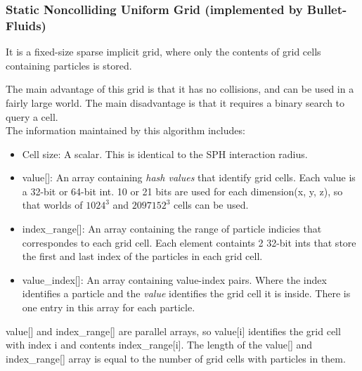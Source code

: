 \documentclass[]{article}
\begin{document}
		\subsubsection{Static Noncolliding Uniform Grid (implemented by Bullet-Fluids) }
			It is a fixed-size sparse implicit grid, where only the contents of grid cells containing particles is stored.
			
			The main advantage of this grid is that it has no collisions, and can be used in a fairly large world. 
			The main disadvantage is that it requires a binary search to query a cell.\\
			
			The information maintained by this algorithm includes:
			\begin{itemize}
				\item Cell size: A scalar. This is identical to the SPH interaction radius.
				\item value[]: An array containing \textit{hash values} that identify grid cells. Each value is a 32-bit or 
				64-bit int. 10 or 21 bits are used for each dimension(x, y, z), so that worlds of \(1024^3\) and 
				\(2097152^3\) cells can be used.
				\item index\_range[]: An array containing the range of particle indicies that correspondes to each grid
				cell. Each element containts 2 32-bit ints that store the first and last index of the particles in each
				grid cell.
				\item value\_index[]: An array containing value-index pairs. Where the index identifies a particle and the
				\textit{value} identifies the grid cell it is inside. There is one entry in this array for each particle.
			\end{itemize}
			
			value[] and index\_range[] are parallel arrays, so value[i] identifies the grid cell with index i and contents 
			index\_range[i]. The length of the value[] and index\_range[] array is equal to the number of grid cells with 
			particles in them.\\
			
\end{document}
